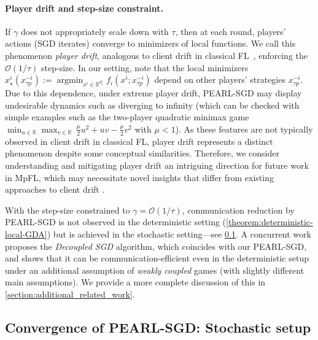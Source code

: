 \documentclass{article}
\newcommand{\algname}[1]{{\color{PineGreen}\sf  #1}\xspace}
\newcommand{\cO}{{\mathcal{O}}}
\DeclareMathOperator*{\argmin}{argmin}
\newcommand{\reals}{\mathbb{R}}
\newcommand{\abbvname}{\algname{PEARL-SGD}}
\theoremstyle{plain}
\theoremstyle{remark}
\begin{document}
\paragraph{Player drift and step-size constraint.}
If $\gamma$ does not appropriately scale down with $\tau$, then at each round, players' actions (SGD iterates) converge to minimizers of local functions.
We call this phenomenon \emph{player drift}, analogous to client drift in classical FL~\citep{KarimireddyKaleMohriReddiStichSuresh2020_scaffold}, enforcing the $\cO(1/\tau)$ step-size. 
In our setting, note that the local minimizers $x^i_\star (x_{\tau p}^{-i}) := \argmin_{x^i \in \reals^{d_i}} f_i(x^i; x_{\tau p}^{-i})$ depend on other players' strategies $x_{\tau p}^{-i}$.
Due to this dependence, under extreme player drift, \abbvname may display undesirable dynamics such as diverging to infinity (which can be checked with simple examples such as the two-player quadratic minimax game $\min_{u\in\reals} \max_{v\in\reals} \, \frac{\mu}{2} u^2 + uv - \frac{\mu}{2} v^2$ with $\mu < 1$).
As these features are not typically observed in client drift in classical FL, player drift represents a distinct phenomenon despite some conceptual similarities. Therefore, we consider understanding and mitigating player drift an intriguing direction for future work in MpFL, which may necessitate novel insights that differ from existing approaches to client drift \citep{KarimireddyKaleMohriReddiStichSuresh2020_scaffold, MishchenkoMalinovskyStichRichtarik2022_proxskip}. 

With the step-size constrained to $\gamma=\cO(1/\tau)$, communication reduction by \algname{PEARL-SGD} is not observed in the deterministic setting (\cref{theorem:deterministic-local-GDA}) but is achieved in the stochastic setting---see \cref{section:convergence-stochastic}.
A concurrent work \cite{zindari2025decoupled} proposes the \textit{Decoupled SGD} algorithm, which coincides with our \algname{PEARL-SGD}, and shows that it can be communication-efficient even in the deterministic setup under an additional assumption of \textit{weakly coupled} games (with slightly different main assumptions). We provide a more complete discussion of this in \cref{section:additional_related_work}.

\subsection{Convergence of \abbvname: Stochastic setup}
\label{section:convergence-stochastic}
\end{document}
